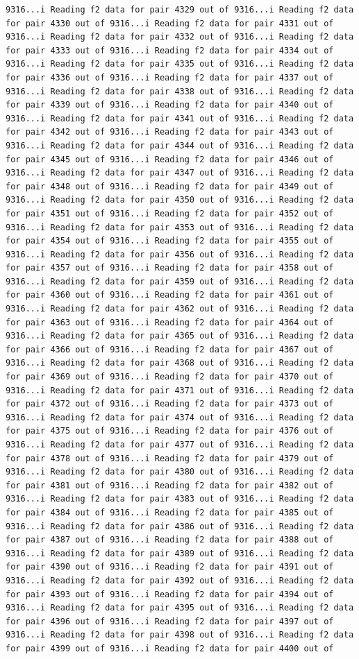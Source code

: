 \documentclass[
]{article}
\begin{document}
\begin{verbatim}
9316...i Reading f2 data for pair 4329 out of 9316...i Reading f2 data for pair 4330 out of 9316...i Reading f2 data for pair 4331 out of 9316...i Reading f2 data for pair 4332 out of 9316...i Reading f2 data for pair 4333 out of 9316...i Reading f2 data for pair 4334 out of 9316...i Reading f2 data for pair 4335 out of 9316...i Reading f2 data for pair 4336 out of 9316...i Reading f2 data for pair 4337 out of 9316...i Reading f2 data for pair 4338 out of 9316...i Reading f2 data for pair 4339 out of 9316...i Reading f2 data for pair 4340 out of 9316...i Reading f2 data for pair 4341 out of 9316...i Reading f2 data for pair 4342 out of 9316...i Reading f2 data for pair 4343 out of 9316...i Reading f2 data for pair 4344 out of 9316...i Reading f2 data for pair 4345 out of 9316...i Reading f2 data for pair 4346 out of 9316...i Reading f2 data for pair 4347 out of 9316...i Reading f2 data for pair 4348 out of 9316...i Reading f2 data for pair 4349 out of 9316...i Reading f2 data for pair 4350 out of 9316...i Reading f2 data for pair 4351 out of 9316...i Reading f2 data for pair 4352 out of 9316...i Reading f2 data for pair 4353 out of 9316...i Reading f2 data for pair 4354 out of 9316...i Reading f2 data for pair 4355 out of 9316...i Reading f2 data for pair 4356 out of 9316...i Reading f2 data for pair 4357 out of 9316...i Reading f2 data for pair 4358 out of 9316...i Reading f2 data for pair 4359 out of 9316...i Reading f2 data for pair 4360 out of 9316...i Reading f2 data for pair 4361 out of 9316...i Reading f2 data for pair 4362 out of 9316...i Reading f2 data for pair 4363 out of 9316...i Reading f2 data for pair 4364 out of 9316...i Reading f2 data for pair 4365 out of 9316...i Reading f2 data for pair 4366 out of 9316...i Reading f2 data for pair 4367 out of 9316...i Reading f2 data for pair 4368 out of 9316...i Reading f2 data for pair 4369 out of 9316...i Reading f2 data for pair 4370 out of 9316...i Reading f2 data for pair 4371 out of 9316...i Reading f2 data for pair 4372 out of 9316...i Reading f2 data for pair 4373 out of 9316...i Reading f2 data for pair 4374 out of 9316...i Reading f2 data for pair 4375 out of 9316...i Reading f2 data for pair 4376 out of 9316...i Reading f2 data for pair 4377 out of 9316...i Reading f2 data for pair 4378 out of 9316...i Reading f2 data for pair 4379 out of 9316...i Reading f2 data for pair 4380 out of 9316...i Reading f2 data for pair 4381 out of 9316...i Reading f2 data for pair 4382 out of 9316...i Reading f2 data for pair 4383 out of 9316...i Reading f2 data for pair 4384 out of 9316...i Reading f2 data for pair 4385 out of 9316...i Reading f2 data for pair 4386 out of 9316...i Reading f2 data for pair 4387 out of 9316...i Reading f2 data for pair 4388 out of 9316...i Reading f2 data for pair 4389 out of 9316...i Reading f2 data for pair 4390 out of 9316...i Reading f2 data for pair 4391 out of 9316...i Reading f2 data for pair 4392 out of 9316...i Reading f2 data for pair 4393 out of 9316...i Reading f2 data for pair 4394 out of 9316...i Reading f2 data for pair 4395 out of 9316...i Reading f2 data for pair 4396 out of 9316...i Reading f2 data for pair 4397 out of 9316...i Reading f2 data for pair 4398 out of 9316...i Reading f2 data for pair 4399 out of 9316...i Reading f2 data for pair 4400 out of 
\end{verbatim}
\end{document}
